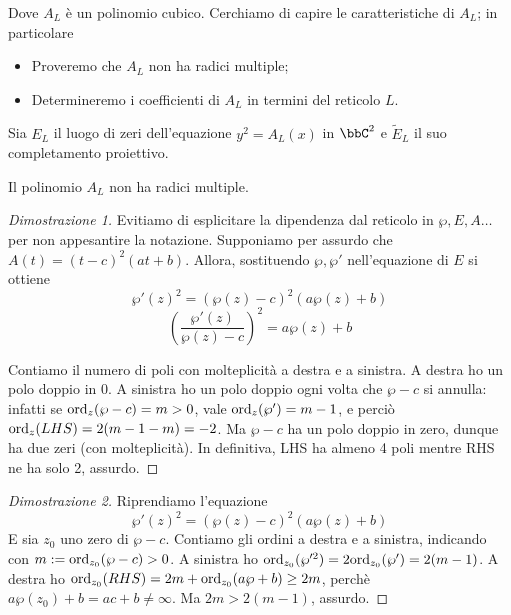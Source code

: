 Dove $A_L$ è un polinomio cubico. Cerchiamo di capire le caratteristiche di $A_L$; in particolare
\begin{itemize}
\item Proveremo che $A_L$ non ha radici multiple;
\item Determineremo i coefficienti di $A_L$ in termini del reticolo $L$.
\end{itemize}

Sia $E_L$ il luogo di zeri dell'equazione $y^2=A_L(x)$ in $\bbC^2$ e $\tilde{E}_L$ il suo completamento proiettivo.
\begin{proposizione}
Il polinomio $A_L$ non ha radici multiple.
\end{proposizione}

\begin{proof}[Dimostrazione 1]
Evitiamo di esplicitare la dipendenza dal reticolo in $\wp, E,A \dots$ per non appesantire la notazione. Supponiamo per assurdo che $A(t) = (t-c)^2(at+b)$. Allora, sostituendo $\wp, \wp'$ nell'equazione di $E$ si ottiene
$$\wp'(z)^2 = (\wp(z) - c)^2(a\wp(z)+b) $$
$$ \left ( \frac{\wp'(z)}{\wp(z)-c} \right )^2 = a\wp(z)+b $$

Contiamo il numero di poli con molteplicità a destra e a sinistra. A destra ho un polo doppio in $0$. A sinistra ho un polo doppio ogni volta che $\wp - c$ si annulla: infatti se $\text{ord}_{z}(\wp -c) = m > 0$, vale $\text{ord}_{z}(\wp') = m-1$, e perciò $\text{ord}_{z}(LHS) = 2(m-1-m) = -2$. Ma $\wp-c$ ha un polo doppio in zero, dunque ha due zeri (con molteplicità). In definitiva, LHS ha almeno 4 poli mentre RHS ne ha solo 2, assurdo.
\end{proof}

\begin{proof}[Dimostrazione 2]
Riprendiamo l'equazione
$$\wp'(z)^2 = (\wp(z) - c)^2(a\wp(z)+b) $$
E sia $z_0$ uno zero di $\wp-c$. Contiamo gli ordini a destra e a sinistra, indicando con $m:=\text{ord}_{z_0}(\wp-c) > 0$.
A sinistra ho $\text{ord}_{z_0}( \wp'^2) = 2\text{ord}_{z_0}( \wp') = 2(m-1)$. A destra ho $\text{ord}_{z_0}(RHS) = 2m + \text{ord}_{z_0}(a\wp+b) \ge 2m$, perchè $a \wp(z_0)+b = ac+b \neq \infty$. Ma $2m> 2(m-1)$, assurdo.
\end{proof}

